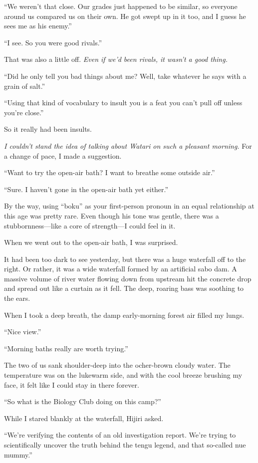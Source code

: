 \documentclass[
    a4paper,
    12pt,
    twoside,
    openany,
    UTF8,
    fontset=windows
]{ctexbook}
\begin{document}
``We weren't that close. Our grades just happened to be similar, so everyone around us compared us on their own. He got swept up in it too, and I guess he sees me as his enemy.''

``I see. So you were good rivals.''

That was also a little off. \textit{Even if we'd been rivals, it wasn't a good thing.}

``Did he only tell you bad things about me? Well, take whatever he says with a grain of salt.''

``Using that kind of vocabulary to insult you is a feat you can't pull off unless you're close.''

So it really had been insults.

\textit{I couldn't stand the idea of talking about Watari on such a pleasant morning.} For a change of pace, I made a suggestion.

``Want to try the open-air bath? I want to breathe some outside air.''

``Sure. I haven't gone in the open-air bath yet either.''

By the way, using ``boku'' as your first-person pronoun in an equal relationship at this age was pretty rare. Even though his tone was gentle, there was a stubbornness---like a core of strength---I could feel in it.

When we went out to the open-air bath, I was surprised.

It had been too dark to see yesterday, but there was a huge waterfall off to the right. Or rather, it was a wide waterfall formed by an artificial sabo dam. A massive volume of river water flowing down from upstream hit the concrete drop and spread out like a curtain as it fell. The deep, roaring bass was soothing to the ears.

When I took a deep breath, the damp early-morning forest air filled my lungs.

``Nice view.''

``Morning baths really are worth trying.''

The two of us sank shoulder-deep into the ocher-brown cloudy water. The temperature was on the lukewarm side, and with the cool breeze brushing my face, it felt like I could stay in there forever.

``So what is the Biology Club doing on this camp?''

While I stared blankly at the waterfall, Hijiri asked.

``We're verifying the contents of an old investigation report. We're trying to scientifically uncover the truth behind the tengu legend, and that so-called nue mummy.''
\end{document}
